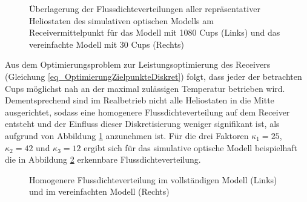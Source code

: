 \begin{figure}[h!]
    \centering
    \setlength{\fboxsep}{1pt}
    \setlength{\fboxrule}{1pt}
    \caption[Überlagerung der Flussdichteverteilungen aller repräsentativer Heliostaten des simulativen optischen Modells am Receivermittelpunkt für das Modell mit 1080 Cups und das vereinfachte Modell mit 30 Cups]{Überlagerung der Flussdichteverteilungen aller repräsentativer Heliostaten des simulativen optischen Modells am Receivermittelpunkt für das Modell mit 1080 Cups (Links) und das vereinfachte Modell mit 30 Cups (Rechts)}
    \label{fig_statischerZielpunkt363065}
\end{figure}

Aus dem Optimierungsproblem zur Leistungsoptimierung des Receivers (Gleichung \ref{eq_OptimierungZielpunkteDiskret}) folgt, dass jeder der betrachten Cups möglichst nah an der maximal zulässigen Temperatur betrieben wird.
Dementsprechend sind im Realbetrieb nicht alle Heliostaten in die Mitte ausgerichtet, sodass eine homogenere Flussdichteverteilung auf dem Receiver entsteht und der Einfluss dieser Diskretisierung weniger signifikant ist, als aufgrund von Abbildung \ref{fig_statischerZielpunkt363065} anzunehmen ist.
Für die drei Faktoren $\kappa_1 = 25$, $\kappa_2 = 42$ und $\kappa_3 = 12$ ergibt sich für das simulative optische Modell beispielhaft die in Abbildung \ref{fig_dispersionSTRAL36300605} erkennbare Flussdichteverteilung.

\enlargethispage{\baselineskip}
\begin{figure}[h!]
    \centering
    \setlength{\fboxsep}{1pt}
    \setlength{\fboxrule}{1pt}
    \caption[Homogenere Flussdichteverteilung im vollständigen Modell und im vereinfachten Modell]{Homogenere Flussdichteverteilung im vollständigen Modell (Links) und im vereinfachten Modell (Rechts)}
    \label{fig_dispersionSTRAL36300605}
\end{figure}

